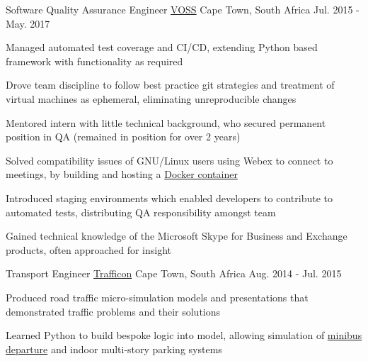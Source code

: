 \begin{cventries}
  \cventry
    {Software Quality Assurance Engineer} %
    {\href{https://www.voss-solutions.com}{VOSS}} %
    {Cape Town, South Africa} %
    {Jul. 2015 - May. 2017} %
    {
      \begin{cvitems} %
        \item {Managed automated test coverage and CI/CD, extending Python based framework with functionality as required}
        \item {Drove team discipline to follow best practice git strategies and treatment of virtual machines as ephemeral, eliminating unreproducible changes}
        \item {Mentored intern with little technical background, who secured permanent position in QA (remained in position for over 2 years)}
        \item {Solved compatibility issues of GNU/Linux users using Webex to connect to meetings, by building and hosting a \href{https://hub.docker.com/r/dnk8n/docker-webex}{Docker container}}
        \item {Introduced staging environments which enabled developers to contribute to automated tests, distributing QA responsibility amongst team}
        \item {Gained technical knowledge of the Microsoft Skype for Business and Exchange products, often approached for insight}
      \end{cvitems}
    }

  \cventry
    {Transport Engineer} %
    {\href{http://trafficon.co.za}{Trafficon}} %
    {Cape Town, South Africa} %
    {Aug. 2014 - Jul. 2015} %
    {
      \begin{cvitems} %
        \item {Produced road traffic micro-simulation models and presentations that demonstrated traffic problems and their solutions}
        \item {Learned Python to build bespoke logic into model, allowing simulation of \href{https://www.youtube.com/watch?v=RjTvDzyl8WA}{minibus departure} and indoor multi-story parking systems}
      \end{cvitems}
    }

\end{cventries}
